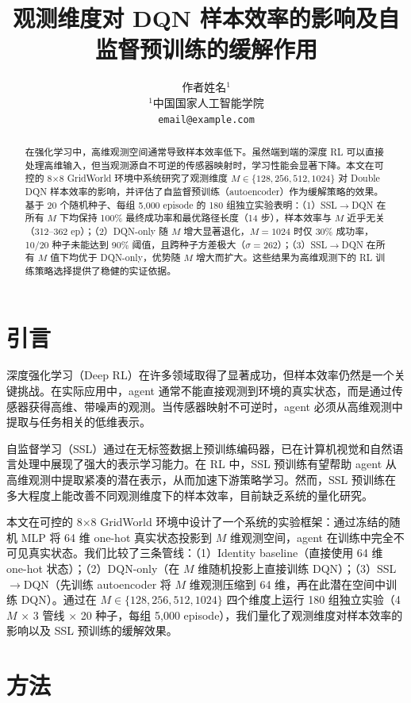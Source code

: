\documentclass[11pt,a4paper]{ctexart}
\title{\textbf{观测维度对 DQN 样本效率的影响及自监督预训练的缓解作用}}
\author{
  作者姓名$^{1}$ \\
  $^{1}$中国国家人工智能学院 \\
  \texttt{email@example.com}
}
\date{}
\begin{document}
\maketitle

\begin{abstract}
在强化学习中，高维观测空间通常导致样本效率低下。虽然端到端的深度 RL 可以直接处理高维输入，但当观测源自不可逆的传感器映射时，学习性能会显著下降。本文在可控的 8×8 GridWorld 环境中系统研究了观测维度 $M \in \{128, 256, 512, 1024\}$ 对 Double DQN 样本效率的影响，并评估了自监督预训练（autoencoder）作为缓解策略的效果。基于 20 个随机种子、每组 5,000 episode 的 180 组独立实验表明：（1）SSL$\to$DQN 在所有 $M$ 下均保持 100\% 最终成功率和最优路径长度（14 步），样本效率与 $M$ 近乎无关（312--362 ep）；（2）DQN-only 随 $M$ 增大显著退化，$M=1024$ 时仅 30\% 成功率，10/20 种子未能达到 90\% 阈值，且跨种子方差极大（$\sigma=262$）；（3）SSL$\to$DQN 在所有 $M$ 值下均优于 DQN-only，优势随 $M$ 增大而扩大。这些结果为高维观测下的 RL 训练策略选择提供了稳健的实证依据。
\end{abstract}

\section{引言}

深度强化学习（Deep RL）在许多领域取得了显著成功，但样本效率仍然是一个关键挑战。在实际应用中，agent 通常不能直接观测到环境的真实状态，而是通过传感器获得高维、带噪声的观测。当传感器映射不可逆时，agent 必须从高维观测中提取与任务相关的低维表示。

自监督学习（SSL）通过在无标签数据上预训练编码器，已在计算机视觉和自然语言处理中展现了强大的表示学习能力。在 RL 中，SSL 预训练有望帮助 agent 从高维观测中提取紧凑的潜在表示，从而加速下游策略学习。然而，SSL 预训练在多大程度上能改善不同观测维度下的样本效率，目前缺乏系统的量化研究。

本文在可控的 8×8 GridWorld 环境中设计了一个系统的实验框架：通过冻结的随机 MLP 将 64 维 one-hot 真实状态投影到 $M$ 维观测空间，agent 在训练中完全不可见真实状态。我们比较了三条管线：（1）Identity baseline（直接使用 64 维 one-hot 状态）；（2）DQN-only（在 $M$ 维随机投影上直接训练 DQN）；（3）SSL$\to$DQN（先训练 autoencoder 将 $M$ 维观测压缩到 64 维，再在此潜在空间中训练 DQN）。通过在 $M \in \{128, 256, 512, 1024\}$ 四个维度上运行 180 组独立实验（4 $M$ × 3 管线 × 20 种子，每组 5,000 episode），我们量化了观测维度对样本效率的影响以及 SSL 预训练的缓解效果。

\section{方法}
\end{document}
